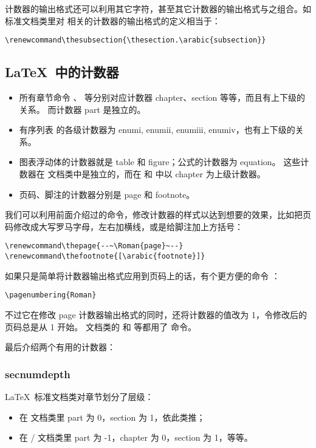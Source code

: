 计数器的输出格式还可以利用其它字符，甚至其它计数器的输出格式与之组合。如标准文档类里对  相关的计数器的输出格式的定义相当于：
\begin{verbatim}
\renewcommand\thesubsection{\thesection.\arabic{subsection}}
\end{verbatim}

\subsection{\LaTeX\ 中的计数器}\label{subsec:latex-counts}

\begin{itemize}
  \item 所有章节命令 、 等分别对应计数器 chapter、section 等等，而且有上下级的关系。
        而计数器 part 是独立的。
  \item 有序列表  的各级计数器为 enumi, enumii, enumiii, enumiv，也有上下级的关系。
  \item 图表浮动体的计数器就是 table 和 figure；公式的计数器为 equation。
        这些计数器在  文档类中是独立的，而在  和  中以 chapter 为上级计数器。
  \item 页码、脚注的计数器分别是 page 和 footnote。
\end{itemize}

我们可以利用前面介绍过的命令，修改计数器的样式以达到想要的效果，比如把页码修改成大写罗马字母，左右加横线，或是给脚注加上方括号：
\begin{verbatim}
\renewcommand\thepage{--~\Roman{page}~--}
\renewcommand\thefootnote{[\arabic{footnote}]}
\end{verbatim}

如果只是简单将计数器输出格式应用到页码上的话，有个更方便的命令 ：
\begin{verbatim}
\pagenumbering{Roman}
\end{verbatim}
不过它在修改 page 计数器输出格式的同时，还将计数器的值改为 1，令修改后的页码总是从 1 开始。 文档类的
 和  等都用了  命令。

最后介绍两个有用的计数器：

\subsubsection{secnumdepth}

\LaTeX\ 标准文档类对章节划分了层级：
\begin{itemize}
  \item 在  文档类里 part 为 0，section 为 1，依此类推；
  \item 在 / 文档类里 part 为 -1，chapter 为 0，section 为 1，等等。
\end{itemize}

